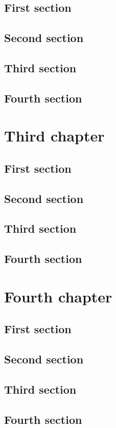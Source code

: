 \documentclass{researchbook}
\begin{document}
\section{First section}\lipsum
\section{Second section}\lipsum
\section{Third section}\lipsum
\section{Fourth section}\lipsum


\chapter{Third chapter}

\section{First section}\lipsum
\section{Second section}\lipsum
\section{Third section}\lipsum
\section{Fourth section}\lipsum


\chapter{Fourth chapter}

\section{First section}\lipsum
\section{Second section}\lipsum
\section{Third section}\lipsum
\section{Fourth section}\lipsum
\end{document}
